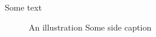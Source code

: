 \documentclass{memoir}
\begin{document}
Some text
\begin{figure}
\begin{sidecaption}{An illustration}
Some side caption
\end{sidecaption}
\end{figure}
\end{document}
